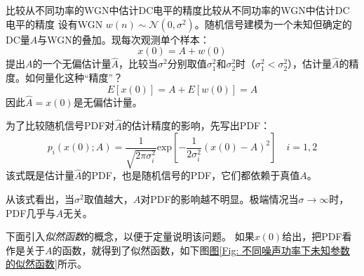        \begin{example}{比较从不同功率的WGN中估计DC电平的精度}{比较从不同功率的WGN中估计DC电平的精度}
            设有WGN $w(n)\sim\mathcal{N}(0,\sigma^2)$。随机信号建模为一个未知但确定的DC量$A$与WGN的叠加。现每次观测单个样本：
            \begin{equation*}
                x(0)=A+w(0)
            \end{equation*}
            提出$A$的一个无偏估计量$\hat{A}$，比较当$\sigma^2$分别取值$\sigma_1^2$和$\sigma_2^2$时（$\sigma_1^2<\sigma_2^2$），估计量$\hat{A}$的精度。如何量化这种“精度”？
            \setlength{\parindent}{2\ccwd}
            \begin{equation*}
                 E\left[x(0)\right]=A+E\left[w(0)\right]=A
            \end{equation*}
            因此$\hat{A}=x(0)$是无偏估计量。
            
            为了比较随机信号PDF对$\hat{A}$的估计精度的影响，先写出PDF：
            \begin{equation*}
                p_i(x(0);A)=\frac{1}{\sqrt{2\pi\sigma_i^2}}\mathrm{exp}\left[-\frac{1}{2\sigma_i^2}\left(x(0)-A\right)^2\right] \quad i=1,2
            \end{equation*}
            该式既是估计量$\hat{A}$的PDF，也是随机信号的PDF，它们都依赖于真值$A$。
            
            从该式看出，当$\sigma^2$取值越大，$A$对PDF的影响越不明显。极端情况当$\sigma\rightarrow\infty$时，PDF几乎与$A$无关。

            下面引入\emph{似然函数}的概念，以便于定量说明该问题。
            如果$x(0)$给出，把PDF看作是关于$A$的函数，就得到了{似然函数}，如下图\hyperref[Fig: 不同噪声功率下未知参数的似然函数]{图\ref*{Fig: 不同噪声功率下未知参数的似然函数}}所示。



\end{example}
